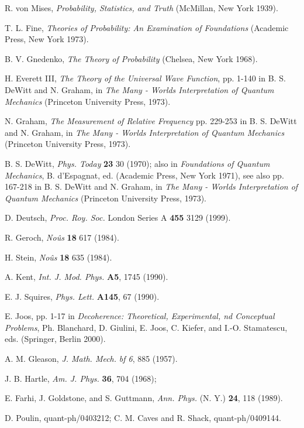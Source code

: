 \documentclass[aps,twocolumn,pra,epsfig]{revtex4}
\begin{document}
\noindent[18] R. von Mises, {\it Probability, Statistics, and Truth} 
(McMillan, New York 1939).

\noindent[19] T. L. Fine, {\it Theories of Probability: 
An Examination of Foundations} (Academic Press, New York 1973).

\noindent[20] B. V. Gnedenko, {\it The Theory of Probability} 
(Chelsea, New York 1968).

\noindent[21] H. Everett III, {\it The Theory of the Universal Wave Function}, 
pp. 1-140 in B. S. DeWitt and N. Graham, in 
{\it The Many - Worlds Interpretation 
of Quantum Mechanics} (Princeton University Press, 1973).

\noindent[22] N. Graham, {\it The Measurement of Relative Frequency} 
pp. 229-253 
in B. S. DeWitt and N. Graham, in {\it The Many - Worlds Interpretation 
of Quantum Mechanics} (Princeton University Press, 1973).

\noindent[23] B. S. DeWitt, {\it Phys. Today} {\bf 23} 30 (1970); also 
in {\it Foundations of Quantum Mechanics}, B. d'Espagnat, ed.
(Academic Press, New York 1971), see also pp. 167-218
in B. S. DeWitt and N. Graham, in {\it The Many - Worlds Interpretation 
of Quantum Mechanics} (Princeton University Press, 1973).

\noindent[24] D. Deutsch, {\it Proc. Roy. Soc.} London Series A {\bf 455} 3129 (1999).

\noindent[25] R. Geroch, {\it No\^us} {\bf 18} 617 (1984).

\noindent[26] H. Stein, {\it No\^us} {\bf 18} 635 (1984).

\noindent[27] A. Kent, {\it Int. J. Mod. Phys.} {\bf A5}, 1745 (1990).

\noindent[28] E. J. Squires, {\it Phys. Lett.} {\bf A145}, 67 (1990).

\noindent[29] E. Joos, pp. 1-17 in {\it Decoherence: Theoretical, 
Experimental, nd  Conceptual Problems}, Ph. Blanchard, D. Giulini, 
E. Joos, C. Kiefer, and I.-O. Stamatescu, eds. (Springer, Berlin 2000).

\noindent[30] A. M. Gleason, {\it J. Math. Mech.} {\it bf 6}, 885 (1957).

\noindent[31] J. B. Hartle, {\it Am. J. Phys.} {\bf 36}, 704 (1968);


\noindent[32] E. Farhi, J. Goldstone, and S. Guttmann, {\it Ann. Phys.} 
(N. Y.) {\bf 24}, 118 (1989).

\noindent[33] D. Poulin, quant-ph/0403212; C. M. Caves and R. Shack, quant-ph/0409144.
\end{document}
